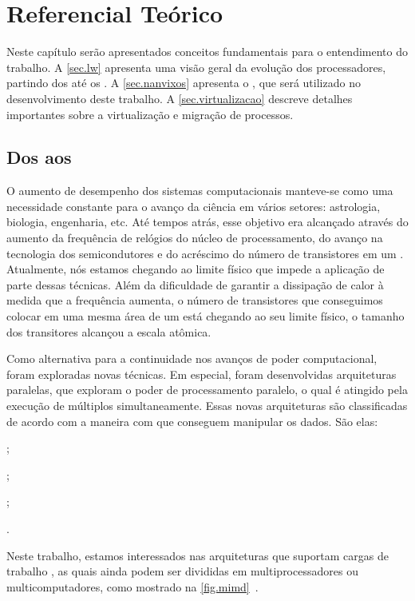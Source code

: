 \glsresetall

\chapter{Referencial Teórico}
\label{chap.background}

Neste capítulo serão apresentados conceitos fundamentais para o entendimento do trabalho. A \autoref{sec.lw} apresenta uma visão geral da evolução dos processadores, partindo dos \singlecores até os \lws. A \autoref{sec.nanvixos} apresenta o \nanvix, \so que será utilizado no desenvolvimento deste trabalho. A \autoref{sec.virtualizacao} descreve detalhes importantes sobre a virtualização e migração de processos.

\section{Dos \singlecores aos \Lws}
\label{sec.lw}

O aumento de desempenho dos sistemas computacionais manteve-se como uma necessidade constante para o avanço da ciência em vários setores: astrologia, biologia, engenharia, etc. Até tempos atrás, esse objetivo era alcançado através do aumento da frequência de relógios do núcleo de processamento, do avanço na tecnologia dos semicondutores e do acréscimo do número de transistores em um \chip. Atualmente, nós estamos chegando ao limite físico que impede a aplicação de parte dessas técnicas. Além da dificuldade de garantir a dissipação de calor à medida que a frequência aumenta, o número de transistores que conseguimos colocar em uma mesma área de um \chip está chegando ao seu limite físico, \ie o tamanho dos transitores alcançou a escala atômica.

Como alternativa para a continuidade nos avanços de poder computacional, foram exploradas novas técnicas. Em especial, foram desenvolvidas arquiteturas paralelas, que exploram o poder de processamento paralelo, o qual é atingido pela execução de múltiplos \cores simultaneamente. Essas novas arquiteturas são classificadas de acordo com a maneira com que conseguem manipular os dados. São elas:
\begin{inlinelist}
    \item \sisd;
    \item \simd;
    \item \misd;
    \item \mimd.
\end{inlinelist}
Neste trabalho, estamos interessados nas arquiteturas que suportam cargas de trabalho \mimd, as quais ainda podem ser divididas em multiprocessadores ou multicomputadores, como mostrado na \autoref{fig.mimd}~\cite{tanenbaum:4ed}.

